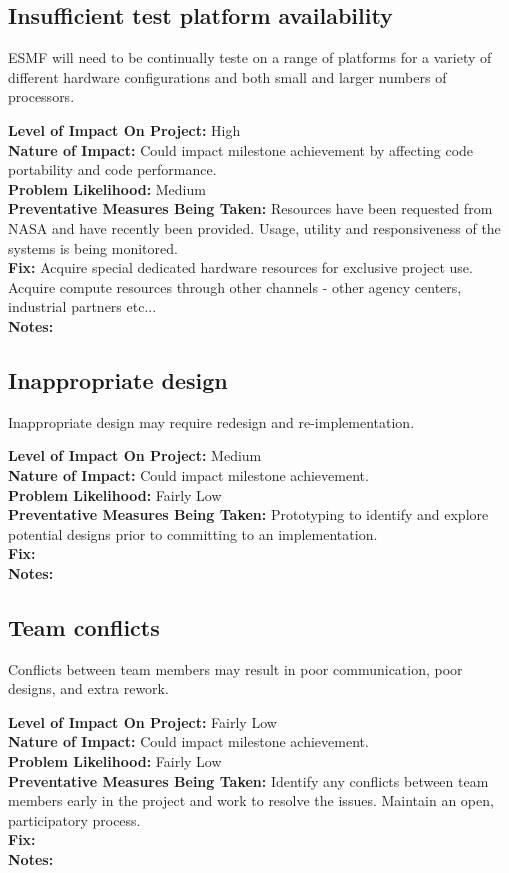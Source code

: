 \documentclass[english]{article}
\newcommand{\sreq}[1]{\subsection{\hspace{.2in}#1}}
\newenvironment
{reqlist}
{\begin{list} {} {} \rm \item[]}
{\end{list}}
\begin{document}
\sreq{Insufficient test platform availability}
ESMF will need to be continually teste on a range of platforms for
a variety of different hardware configurations and both small and larger
numbers of processors.
\begin{reqlist}
{\bf Level of Impact On Project:} High \\
{\bf Nature of Impact:} Could impact milestone achievement by affecting code portability
and code performance.\\
{\bf Problem Likelihood:} Medium \\
{\bf Preventative Measures Being Taken:}
Resources have been requested from NASA and have recently been provided.
Usage, utility and responsiveness of the systems is being monitored.
\\
{\bf Fix:} Acquire special dedicated hardware resources for exclusive project
use.
Acquire compute resources through other channels - other agency centers,
industrial partners etc...
\\
{\bf Notes:} 
\end{reqlist}

\sreq{Inappropriate design}
Inappropriate design may require redesign and re-implementation.
\begin{reqlist}
{\bf Level of Impact On Project:} Medium \\
{\bf Nature of Impact:} Could impact milestone achievement.\\
{\bf Problem Likelihood:} Fairly Low \\
{\bf Preventative Measures Being Taken:}
Prototyping to identify and explore potential designs prior to committing to
an implementation.
\\
{\bf Fix:}\\
{\bf Notes:} 
\end{reqlist}

\sreq{Team conflicts}
Conflicts between team members may result in poor communication, poor designs,
and extra rework.
\begin{reqlist}
{\bf Level of Impact On Project:} Fairly Low \\
{\bf Nature of Impact:} Could impact milestone achievement.\\
{\bf Problem Likelihood:} Fairly Low \\
{\bf Preventative Measures Being Taken:}
Identify any conflicts between team members early in the project and work to
resolve the issues. Maintain an open, participatory process.
\\
{\bf Fix:}\\
{\bf Notes:} 
\end{reqlist}
\end{document}
